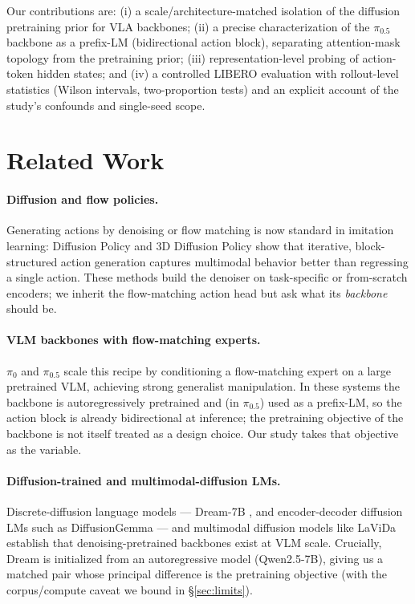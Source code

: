 \documentclass{article}
\begin{document}
Our contributions are: (i) a scale/architecture-matched isolation of the
diffusion pretraining prior for VLA backbones; (ii) a precise characterization of
the \(\pi_{0.5}\) backbone as a prefix-LM (bidirectional action block), separating
attention-mask topology from the pretraining prior; (iii) representation-level
probing of action-token hidden states; and (iv) a controlled LIBERO evaluation
with rollout-level statistics (Wilson intervals, two-proportion tests) and an
explicit account of the study's confounds and single-seed scope.

\section{Related Work}

\paragraph{Diffusion and flow policies.} Generating actions by denoising or flow
matching is now standard in imitation learning: Diffusion Policy \cite{diffusion_policy}
and 3D Diffusion Policy \cite{dp3} show that iterative, block-structured action
generation captures multimodal behavior better than regressing a single action.
These methods build the denoiser on task-specific or from-scratch encoders; we
inherit the flow-matching action head but ask what its \emph{backbone} should be.

\paragraph{VLM backbones with flow-matching experts.} $\pi_0$ and $\pi_{0.5}$
\cite{pi0,pi05,openpi} scale this recipe by conditioning a flow-matching expert on
a large pretrained VLM, achieving strong generalist manipulation. In these systems
the backbone is autoregressively pretrained and (in $\pi_{0.5}$) used as a
prefix-LM, so the action block is already bidirectional at inference; the
pretraining objective of the backbone is not itself treated as a design choice.
Our study takes that objective as the variable.

\paragraph{Diffusion-trained and multimodal-diffusion LMs.} Discrete-diffusion
language models --- Dream-7B \cite{dream}, and encoder-decoder diffusion LMs such
as DiffusionGemma \cite{diffusiongemma_docs} --- and multimodal diffusion models
like LaViDa \cite{lavida} establish that denoising-pretrained backbones exist at
VLM scale. Crucially, Dream is initialized from an autoregressive model
(Qwen2.5-7B), giving us a matched pair whose principal difference is the
pretraining objective (with the corpus/compute caveat we bound in
\S\ref{sec:limits}).
\end{document}
